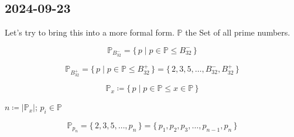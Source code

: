 \documentclass[a4paper,10pt]{article}
\begin{document}
\subsection*{2024-09-23}

\newcommand{\PP}{\mathbb{P}}
\newcommand{\Bm}[1]{B^-_{32}}
\newcommand{\Bp}[1]{B^+_{32}}
\newcommand{\set}[1]{\lbrace \, {#1} \, \rbrace}
\newcommand{\Set}[2]{\set{ {#1} \;|\; {#2} }}

Let's try to bring this into a more formal form.
$\PP$ the Set of all prime numbers.

$$\PP_{\Bm{32}} = \Set{p}{p \in \PP \leq \Bm{32}}$$

$$\PP_{\Bp{32}} = \Set{p}{p \in \PP \leq \Bp{32}} = \set{2, 3, 5, \dots, \Bm{32}, \Bp{32}}$$

$$\PP_{x} \coloneq \Set{p}{p \in \PP \leq x \in \PP}$$

$n \coloneq |\PP_x|$; $p_i \in \PP$

$$\PP_{p_n}
= \set{2, 3, 5, \dots, p_n}
= \set{p_1, p_2, p_3, \dots, p_{n-1}, p_n}$$
\end{document}
